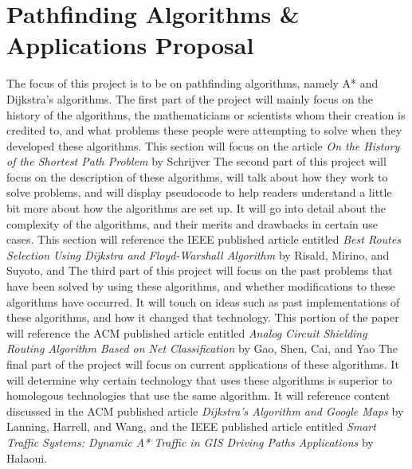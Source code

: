 \documentclass[12pt]{article}
\begin{document}
\section*{Pathfinding Algorithms \& Applications Proposal}
The focus of this project is to be on pathfinding algorithms, namely A* and Dijkstra's algorithms. The first part of the project will mainly focus on the history of the algorithms, the mathematicians or scientists whom their creation is credited to, and what problems these people were attempting to solve when they developed these algorithms. This section will focus on the article \textit{On the History of the Shortest Path Problem} by Schrijver
\newline \newline
The second part of this project will focus on the description of these algorithms, will talk about how they work to solve problems, and will display pseudocode to help readers understand a little bit more about how the algorithms are set up. It will go into detail about the complexity of the algorithms, and their merits and drawbacks in certain use cases. This section will reference the IEEE published article entitled \textit{Best Routes Selection Using Dijkstra and Floyd-Warshall Algorithm} by Risald, Mirino, and Suyoto, and 
\newline \newline
The third part of this project will focus on the past problems that have been solved by using these algorithms, and whether modifications to these algorithms have occurred. It will touch on ideas such as past implementations of these algorithms, and how it changed that technology. This portion of the paper will reference the ACM published article entitled \textit{Analog Circuit Shielding Routing Algorithm Based on Net Classification} by Gao, Shen, Cai, and Yao
\newline \newline
The final part of the project will focus on current applications of these algorithms. It will determine why certain technology that uses these algorithms is superior to homologous technologies that use the same algorithm. It will reference content discussed in the ACM published article \textit{Dijkstra's Algorithm and Google Maps} by Lanning, Harrell, and Wang, and the IEEE published article entitled \textit{Smart Traffic Systems: Dynamic A* Traffic in GIS Driving Paths Applications} by Halaoui.
\end{document}
